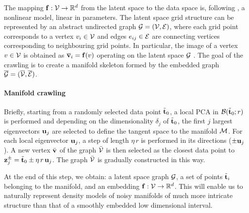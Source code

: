 The mapping $\boldsymbol{\mathbf{f}}: \mathcal{V} \to \mathbb{R}^d$ from the latent space to the data space is, following \citet{Bishop1998GTMTG},
a nonlinear model, linear in parameters.
The latent space grid structure can be represented by an abstract undirected graph $\mathcal{G} = (\mathcal{V},\mathcal{E})$, where each grid point corresponds to a vertex $v_i \in \mathcal{V}$ and edges $e_{ij} \in \mathcal{E}$ are connecting vertices corresponding to neighbouring grid points.
In particular, the image of a vertex $v \in \mathcal{V}$ %
is obtained as $\overline{\boldsymbol{\mathbf{v}}}_i = \boldsymbol{\mathbf{f}}(v)$ operating on the latent space $\mathcal{G}$ \citep[see section 3.1 of][for details]{Canducci2021}.
The goal of the crawling is to create a manifold skeleton formed by the embedded graph
$\overline{\mathcal{G}} = (\overline{\mathcal{V}},\overline{\mathcal{E}})$.%

\paragraph{Manifold crawling}
Briefly, starting from a randomly selected data point $\tilde{\boldsymbol{\mathbf{t}}}_0$, a local PCA in $\mathcal{B}(\tilde{\boldsymbol{\mathbf{t}}}_0;r)$ is performed and depending on the dimensionality $\delta_j$ of $\tilde{\boldsymbol{\mathbf{t}}}_0$, the first $j$ largest eigenvectors $\boldsymbol{\mathbf{u}}_j$ are selected to define the tangent space to the manifold $\mathcal{M}$.
For each local eigenvector $\boldsymbol{\mathbf{u}}_j$, a step of length $\eta\, r$ is performed in its directions ($\pm \boldsymbol{\mathbf{u}}_j$). A new vertex $\bar{\boldsymbol{\mathbf{v}}}$ of the graph $\bar{\mathcal{V}}$ is then selected as the closest data point to $\boldsymbol{\mathbf{z}}_j^{\pm} = \tilde{\boldsymbol{\mathbf{t}}}_0 \pm \eta\, r\, \boldsymbol{\mathbf{u}}_j$.
The graph $\bar{\mathcal{V}}$ is gradually constructed in this way.

At the end of this step, we obtain: a latent space graph $\mathcal{G}$, a set of points $\tilde{\boldsymbol{\mathbf{t}}}_i$ belonging to the manifold, and an embedding $\boldsymbol{\mathbf{f}}: \mathcal{V} \rightarrow \mathbb{R}^d$.
This will enable us to naturally represent density models of noisy manifolds of much more intricate structure than that of a smoothly embedded low dimensional interval.


